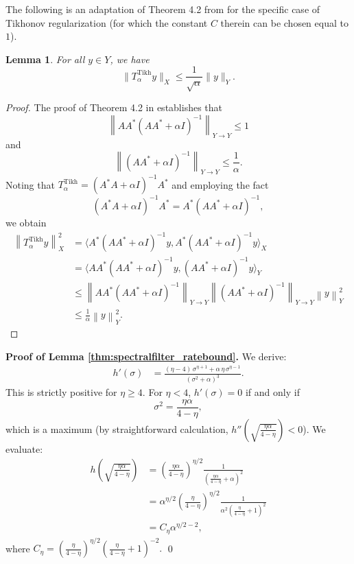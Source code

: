 \documentclass{article}
\newtheorem{lemma}[theorem]{Lemma}
\theoremstyle{definition}
\newcommand{\smallnorm}[1]{\lVert#1\rVert}
\begin{document}
The following is an adaptation of Theorem 4.2 from \cite{engl2000regularization} for the specific case of Tikhonov regularization (for which the constant $C$ therein can be chosen equal to $1$).

\begin{lemma}
    \label{thm:tikhonovbounded}
    For all \(y\in Y\), we have
    \begin{equation*}
    \smallnorm{T^{\mathrm{Tikh}}_{\alpha}y}_X
    \leq
    \frac{1}{\sqrt{\alpha}}\smallnorm{y}_Y.
    \end{equation*}
\end{lemma}

\begin{proof}
The proof of Theorem 4.2 in \cite{engl2000regularization} establishes that 
$$
\left\| A A^* (A A^* + \alpha I)^{-1} \right\|_{Y \to Y} \leq 1
$$
and 
$$
\left\|(A A^* + \alpha I)^{-1} \right\|_{Y \to Y} \leq \frac{1}{\alpha}.
$$
Noting that $T_\alpha^{\mathrm{Tikh}} = (A^* A + \alpha I)^{-1} A^*$ and employing the fact
$$
\left(A^* A + \alpha I\right)^{-1} A^* = A^* \left(A A^* + \alpha I \right)^{-1},
$$ we obtain
\begin{align*}
\left\|T_\alpha^{\mathrm{Tikh}} y \right\|^2_X &= \langle A^* \left( A A^* + \alpha I \right)^{-1} y, A^* \left(A A^* + \alpha I \right)^{-1} y\rangle_X\\
& = \langle A A^* \left( A A^* + \alpha I \right)^{-1} y, \left( A A^* + \alpha I \right)^{-1} y \rangle_Y\\
 &\leq \left\| A A^* (A A^* + \alpha I)^{-1} \right\|_{Y \to Y} \left\| (A A^* + \alpha I)^{-1} \right\|_{Y \to Y} \left\|y\right\|_Y^2\\
 &\leq \frac{1}{\alpha} \left\|y\right\|_Y^2.
\end{align*}
\end{proof}
\noindent\textbf{Proof of Lemma \ref{thm:spectralfilter_ratebound}.}
    We derive:
    \begin{align*}
        h'(\sigma) &= \frac{(\eta-4) \, \sigma^{\eta+1} + \alpha \, \eta \, \sigma^{\eta-1}}{(\sigma^2+\alpha)^3}.
    \end{align*}
    This is strictly positive for \(\eta \geq 4\). For $\eta<4$, 
    $h'(\sigma)=0$ if and only if
    \begin{equation*}
        \sigma^2 = \frac{\eta\alpha}{4-\eta},
    \end{equation*}
    which is a maximum (by straightforward calculation, $h''(\sqrt{\frac{\eta \alpha}{4-\eta}})<0$). 
    We evaluate:
    \begin{align*}
        h\left(\sqrt{\frac{\eta\alpha}{4-\eta}}\right)
        &=
        \left(\frac{\eta\alpha}{4-\eta}\right)^{\eta/2}
        \frac{1}{\left(\frac{\eta\alpha}{4-\eta} + \alpha\right)^2}
        \\
        &=
        \alpha^{\eta/2}
        \left(\frac{\eta}{4-\eta}\right)^{\eta/2}
        \frac{1}{\alpha^2\left(\frac{\eta}{4-\eta} + 1\right)^2}
        \\
        &=
        C_\eta
        \alpha^{\eta/2-2},
    \end{align*}
    where $C_\eta = \left(\frac{\eta}{4-\eta}\right)^{\eta/2}  \left(\frac{\eta}{4-\eta} + 1\right)^{-2}.$
\qed
\end{document}
